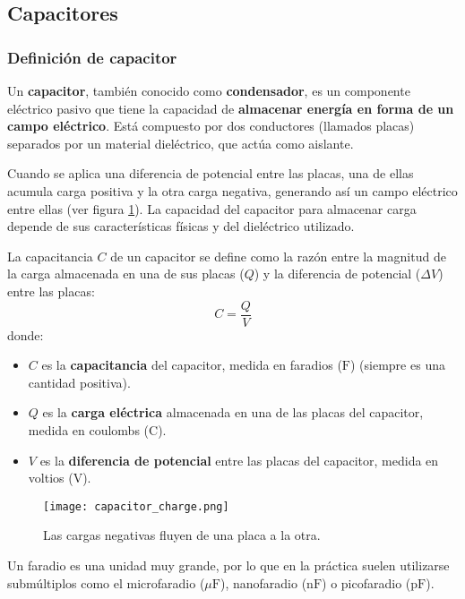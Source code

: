 \subsection{Capacitores}

\subsubsection{Definición de capacitor}

Un \textbf{capacitor}, también conocido como \textbf{condensador}, es un componente eléctrico pasivo que tiene la capacidad de \textbf{almacenar energía en forma de un campo eléctrico}. Está compuesto por dos conductores (llamados placas) separados por un material dieléctrico, que actúa como aislante.

Cuando se aplica una diferencia de potencial entre las placas, una de ellas acumula carga positiva y la otra carga negativa, generando así un campo eléctrico entre ellas (ver figura \ref{fig:capacitor_charge}). La capacidad del capacitor para almacenar carga depende de sus características físicas y del dieléctrico utilizado.

La capacitancia \( C \) de un capacitor se define como la razón entre la magnitud de la carga almacenada en una de sus placas (\( Q \)) y la diferencia de potencial (\( \Delta V \)) entre las placas:
\begin{equation}
    C = \frac{Q}{V}
    \label{eq:capacitance}    
\end{equation}
donde:
\begin{itemize}
    \item \( C \) es la \textbf{capacitancia} del capacitor, medida en faradios (\(\si{\farad}\)) (siempre es una cantidad positiva).
    \item \( Q \) es la \textbf{carga eléctrica} almacenada en una de las placas del capacitor, medida en coulombs (\(\si{\coulomb}\)).
    \item \( V \) es la \textbf{diferencia de potencial} entre las placas del capacitor, medida en voltios (\(\si{\volt}\)).
\end{itemize}

\begin{figure}[ht]
    \centering
    \texttt{[image: capacitor\_charge.png]}
    \caption{Las cargas negativas fluyen de una placa a la otra.}
    \label{fig:capacitor_charge}
\end{figure}

Un faradio es una unidad muy grande, por lo que en la práctica suelen utilizarse submúltiplos como el microfaradio (\(\mu\si{\farad}\)), nanofaradio (n\(\si{\farad}\)) o picofaradio (p\(\si{\farad}\)).

